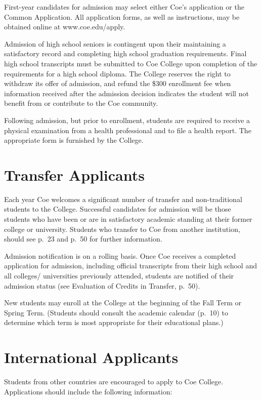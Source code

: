 \documentclass[
  letterpaper,
]{scrbook}
\begin{document}
First-year candidates for admission may select either Coe's application
or the Common Application. All application forms, as well as
instructions, may be obtained online at www.coe.edu/apply.

Admission of high school seniors is contingent upon their maintaining a
satisfactory record and completing high school graduation requirements.
Final high school transcripts must be submitted to Coe College upon
completion of the requirements for a high school diploma. The College
reserves the right to withdraw its offer of admission, and refund the
\$300 enrollment fee when information received after the admission
decision indicates the student will not benefit from or contribute to
the Coe community.

Following admission, but prior to enrollment, students are required to
receive a physical examination from a health professional and to file a
health report. The appropriate form is furnished by the College.

\section{Transfer Applicants}\label{transfer-applicants}

Each year Coe welcomes a significant number of transfer and
non-traditional students to the College. Successful candidates for
admission will be those students who have been or are in satisfactory
academic standing at their former college or university. Students who
transfer to Coe from another institution, should see p.~23 and p.~50 for
further information.

Admission notification is on a rolling basis. Once Coe receives a
completed application for admission, including official transcripts from
their high school and all colleges/ universities previously attended,
students are notified of their admission status (see Evaluation of
Credits in Transfer, p.~50).

New students may enroll at the College at the beginning of the Fall Term
or Spring Term. (Students should consult the academic calendar (p.~10)
to determine which term is most appropriate for their educational
plans.)

\section{International Applicants}\label{international-applicants}

Students from other countries are encouraged to apply to Coe College.
Applications should include the following information:
\end{document}
